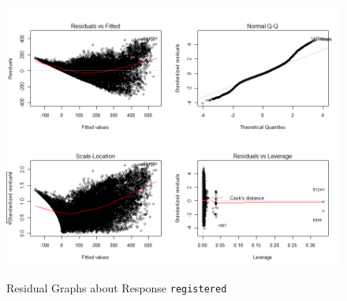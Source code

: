 \begin{figure}[ht]
  \centering
  \includegraphics[width=\linewidth]{pic/registered.png}\\
  \caption{Residual Graphs about Response \texttt{registered}}\label{fig:registered}
\end{figure}

